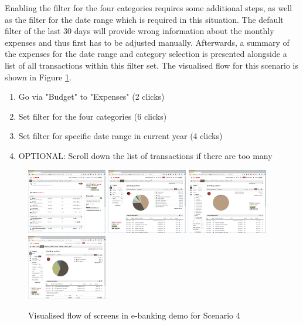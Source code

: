 Enabling the filter for the four categories requires some additional steps, as well as the filter for the date range which is required in this situation. The default filter of the last 30 days will provide wrong information about the monthly expenses and thus first has to be adjusted manually. Afterwards, a summary of the expenses for the date range and category selection is presented alongside a list of all transactions within this filter set. The visualised flow for this scenario is shown in Figure \ref{fig:scenariofourebanking}.
\begin{enumerate}
	\item Go via "Budget" to "Expenses" (2 clicks)
	\item Set filter for the four categories (6 clicks)
	\item Set filter for specific date range in current year (4 clicks)
	\item OPTIONAL: Scroll down the list of transactions if there are too many
\end{enumerate}
\begin{figure}[h]
	\begin{center}
		\includegraphics[width=3.5cm]{03_Figures/09_Evaluation/UBS_1_Overview.png}
		\includegraphics[width=3.5cm]{03_Figures/09_Evaluation/UBS_2_SpendingAnalysis.png}
		\includegraphics[width=3.5cm]{03_Figures/09_Evaluation/UBS_2_SpendingAnalysis_FilterCat.png}
		\includegraphics[width=3.5cm]{03_Figures/09_Evaluation/UBS_2_SpendingAnalysis_Filter.png}
		\caption{Visualised flow of screens in e-banking demo for Scenario 4}
		\label{fig:scenariofourebanking}
	\end{center}
\end{figure}

